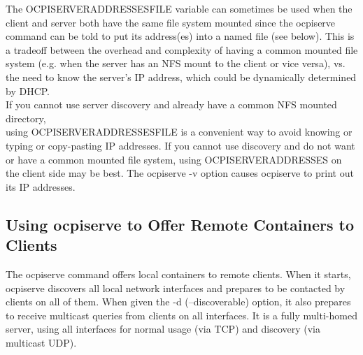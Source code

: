 \documentclass[10pt, a4paper, oneside]{article}
\renewcommand\_{\textunderscore\allowbreak} %
\begin{document}
The OCPI\_SERVER\_ADDRESSES\_FILE variable can sometimes be used when the client and server both have the same file system mounted since the ocpiserve command can be told to put its address(es) into a named file (see below).  This is a tradeoff between the overhead and complexity of having a common mounted file system (e.g. when the server has an NFS mount to the client or vice versa), vs. the need to know the server's IP address, which could be dynamically determined by DHCP.\\

If you cannot use server discovery and already have a common NFS mounted directory, \\
using OCPI\_SERVER\_ADDRESSES\_FILE is a convenient way to avoid knowing or typing or copy-pasting IP addresses.  If you cannot use discovery and do not want or have a common mounted file system, using OCPI\_SERVER\_ADDRESSES on the client side may be best.  The ocpiserve -v option causes ocpiserve to print out its IP addresses.
\subsection{Using ocpiserve to Offer Remote Containers to Clients}
The ocpiserve command offers local containers to remote clients.  When it starts, ocpiserve discovers all local network interfaces and prepares to be contacted by clients on all of them. When given the {-d (--discoverable)} option, it also prepares to receive multicast queries from clients on all interfaces.  It is a fully multi-homed server, using all interfaces for normal usage (via TCP) and discovery (via multicast UDP). \\
\end{document}
